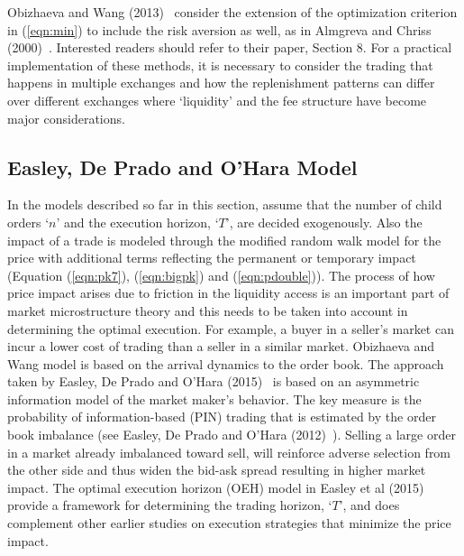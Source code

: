 Obizhaeva and Wang (2013)~\cite{obizhaeva} consider the extension of the optimization criterion in (\ref{eqn:min}) to include the risk aversion as well, as in Almgreva and Chriss (2000)~\cite{alm2000}. Interested readers should refer to their paper, Section 8. For a practical implementation of these methods, it is necessary to consider the trading that happens in multiple exchanges and how the replenishment patterns can differ over different exchanges where `liquidity' and the fee structure have become major considerations. 


\subsection{Easley, De Prado and O'Hara Model}


In the models described so far in this section, assume that the number of child orders `$n$' and the execution horizon, `$T$', are decided exogenously. Also the impact of a trade is modeled through the modified random walk model for the price with additional terms reflecting the permanent or temporary impact (Equation (\ref{eqn:pk7}), (\ref{eqn:bigpk}) and (\ref{eqn:pdouble})). The process of how price impact arises due to friction in the liquidity access is an important part of market microstructure theory and this needs to be taken into account in determining the optimal execution. For example, a buyer in a seller's market can incur a lower cost of trading than a seller in a similar market. Obizhaeva and Wang model is based on the arrival dynamics to the order book. The approach taken by Easley, De Prado and O'Hara (2015)~\cite{prado2} is based on an asymmetric information model of the market maker's behavior. The key measure is the probability of information-based (PIN) trading that is estimated by the order book imbalance (see Easley, De Prado and O'Hara (2012)~\cite{prado3}). Selling a large order in a market already imbalanced toward sell, will reinforce adverse selection from the other side and thus widen the bid-ask spread resulting in higher market impact. The optimal execution horizon (OEH) model in Easley et al (2015) provide a framework for determining the trading horizon, `$T$', and does complement other earlier studies on execution strategies that minimize the price impact. 


